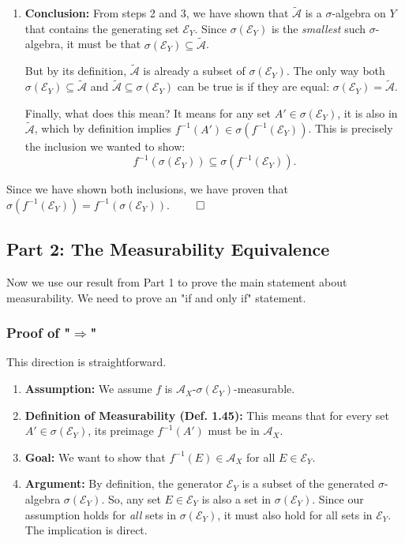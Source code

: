 \documentclass[11pt,a4paper]{article}
\theoremstyle{exercise_style}
\theoremstyle{definition}
\begin{document}
\begin{enumerate}
    \item \textbf{Conclusion:} From steps 2 and 3, we have shown that $\tilde{\mathcal{A}}$ is a $\sigma$-algebra on $Y$ that contains the generating set $\mathcal{E}_Y$. Since $\sigma(\mathcal{E}_Y)$ is the \textit{smallest} such $\sigma$-algebra, it must be that $\sigma(\mathcal{E}_Y) \subseteq \tilde{\mathcal{A}}$.

    But by its definition, $\tilde{\mathcal{A}}$ is already a subset of $\sigma(\mathcal{E}_Y)$. The only way both $\sigma(\mathcal{E}_Y) \subseteq \tilde{\mathcal{A}}$ and $\tilde{\mathcal{A}} \subseteq \sigma(\mathcal{E}_Y)$ can be true is if they are equal: $\sigma(\mathcal{E}_Y) = \tilde{\mathcal{A}}$.

    Finally, what does this mean? It means for any set $A' \in \sigma(\mathcal{E}_Y)$, it is also in $\tilde{\mathcal{A}}$, which by definition implies $f^{-1}(A') \in \sigma(f^{-1}(\mathcal{E}_Y))$. This is precisely the inclusion we wanted to show:
    \[
        f^{-1}(\sigma(\mathcal{E}_Y)) \subseteq \sigma(f^{-1}(\mathcal{E}_Y)).
    \]
\end{enumerate}
Since we have shown both inclusions, we have proven that $\sigma(f^{-1}(\mathcal{E}_Y)) = f^{-1}(\sigma(\mathcal{E}_Y))$.
\hfill $\qed$

\subsection{Part 2: The Measurability Equivalence}

Now we use our result from Part 1 to prove the main statement about measurability. We need to prove an "if and only if" statement.

\subsubsection{Proof of "$\Rightarrow$"}
This direction is straightforward.
\begin{enumerate}
    \item \textbf{Assumption:} We assume $f$ is $\mathcal{A}_X$-$\sigma(\mathcal{E}_Y)$-measurable.
    \item \textbf{Definition of Measurability (Def. 1.45):} This means that for every set $A' \in \sigma(\mathcal{E}_Y)$, its preimage $f^{-1}(A')$ must be in $\mathcal{A}_X$.
    \item \textbf{Goal:} We want to show that $f^{-1}(E) \in \mathcal{A}_X$ for all $E \in \mathcal{E}_Y$.
    \item \textbf{Argument:} By definition, the generator $\mathcal{E}_Y$ is a subset of the generated $\sigma$-algebra $\sigma(\mathcal{E}_Y)$. So, any set $E \in \mathcal{E}_Y$ is also a set in $\sigma(\mathcal{E}_Y)$. Since our assumption holds for \textit{all} sets in $\sigma(\mathcal{E}_Y)$, it must also hold for all sets in $\mathcal{E}_Y$. The implication is direct.
\end{enumerate}
\end{document}
